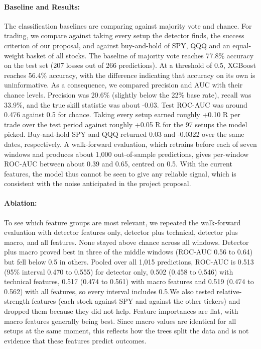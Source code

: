 \documentclass[11pt]{article}
\begin{document}
\paragraph{Baseline and Results:} The classification baselines are comparing against majority vote and chance. For trading, we compare against taking every setup the detector finds, the success criterion of our proposal, and against buy-and-hold of SPY, QQQ and an equal-weight basket of all stocks. The baseline of majority vote reaches 77.8\% accuracy on the test set (207 losses out of 266 predictions). At a threshold of 0.5, XGBoost reaches 56.4\% accuracy, with the difference indicating that accuracy on its own is uninformative. As a consequence, we compared precision and AUC with their chance levels. Precision was 20.6\% (slightly below the 22\% base rate), recall was 33.9\%, and the true skill statistic was about -0.03. Test ROC-AUC was around 0.476 against 0.5 for chance. Taking every setup earned roughly +0.10 R per trade over the test period against roughly +0.05 R for the 97 setups the model picked. Buy-and-hold SPY and QQQ returned 0.03 and -0.0322 over the same dates, respectively. A walk-forward evaluation, which retrains before each of seven windows and produces about 1,000 out-of-sample predictions, gives per-window ROC-AUC between about 0.39 and 0.65, centred on 0.5. With the current features, the model thus cannot be seen to give any reliable signal, which is consistent with the noise anticipated in the project proposal.

\paragraph{Ablation:} To see which feature groups are most relevant, we repeated the walk-forward evaluation with detector features only, detector plus technical, detector plus macro, and all features. None stayed above chance across all windows. Detector plus macro proved best in three of the middle windows (ROC-AUC 0.56 to 0.64) but fell below 0.5 in others. Pooled over all 1,015 predictions, ROC-AUC is 0.513 (95\% interval 0.470 to 0.555) for detector only, 0.502 (0.458 to 0.546) with technical features, 0.517 (0.474 to 0.561) with macro features and 0.519 (0.474 to 0.562) with all features, so every interval includes 0.5.We also tested relative-strength features (each stock against SPY and against the other tickers) and dropped them because they did not help. Feature importances are flat, with macro features generally being best. Since macro values are identical for all setups at the same moment, this reflects how the trees split the data and is not evidence that these features predict outcomes.
\end{document}
